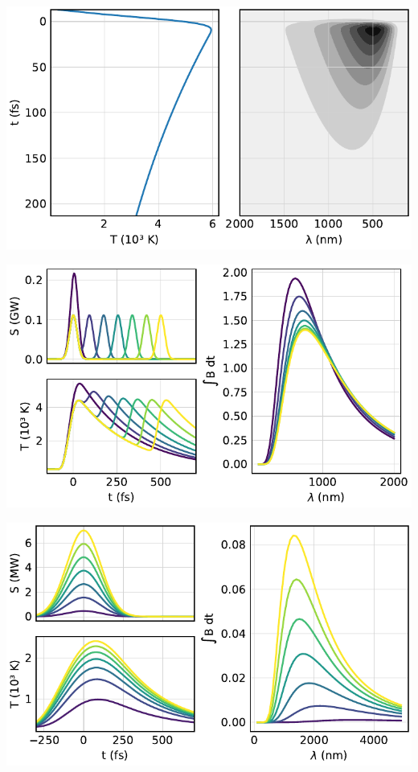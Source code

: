 \begin{frame}
	\centering
	\includegraphics{../model/figures/streak view.pdf}
\end{frame}

\begin{frame}
	\centering
	\includegraphics{../model/figures/double pump sweep.pdf}
\end{frame}

\begin{frame}
	\centering
	\includegraphics{../model/figures/power sweep.pdf}
\end{frame}
